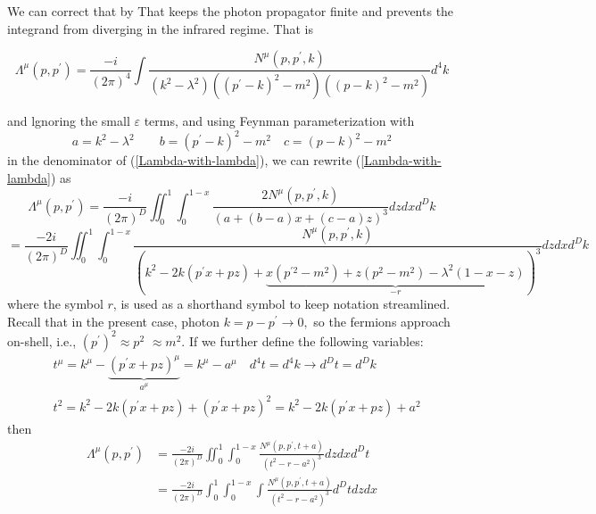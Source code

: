 We can correct that by  That keeps the photon propagator finite and prevents the integrand from diverging in the infrared regime. That is
\begin{qt}
    \begin{equation}\Lambda^{\mu}\left(p, p^{\prime}\right)=\frac{-i}{(2 \pi)^{4}} \int \frac{N^{\mu}\left(p, p^{\prime}, k\right)}{\left(k^{2}-\lambda^{2}\right)\left(\left(p^{\prime}-k\right)^{2}-m^{2}\right)\left((p-k)^{2}-m^{2}\right)} d^{4}k
    \label{Lambda-with-lambda}
    \end{equation}
\end{qt}
and  lgnoring the small $\varepsilon$ terms, and using Feynman parameterization with
$$a=k^{2}-\lambda^{2} \quad \quad b=\left(p^{\prime}-k\right)^{2}-m^{2} \quad c=(p-k)^{2}-m^{2}$$
in the denominator of (\ref{Lambda-with-lambda}), we can rewrite (\ref{Lambda-with-lambda}) as
$$\Lambda^{\mu}\left(p, p^{\prime}\right)=\frac{-i}{(2 \pi)^{D}} \iint_{0}^{1} \int_{0}^{1-x} \frac{2 N^{\mu}\left(p, p^{\prime}, k\right)}{(a+(b-a) x+(c-a) z)^{3}} d z d x d^{D} k$$
$$=\frac{-2 i}{(2 \pi)^{D}} \iint_{0}^{1} \int_{0}^{1-x} \frac{N^{\mu}\left(p, p^{\prime}, k\right)}{\left(k^{2}-2 k\left(p^{\prime} x+p z\right)+\underbrace{x\left(p^{\prime 2}-m^{2}\right)+z\left(p^{2}-m^{2}\right)-\lambda^{2}(1-x-z)}_{-r}\right)^{3}} d z d x d^{D} k$$
where the symbol $r$, is used as a shorthand symbol to keep notation streamlined. Recall that in the present case, photon $k=p-p^{\prime} \rightarrow 0,$ so the fermions approach on-shell, i.e., $\left(p^{\prime}\right)^{2} \approx p^{2}$ $\approx m^{2}$. If we further define the following variables:
$$\begin{aligned}
&t^{\mu}=k^{\mu}-\underbrace{\left(p^{\prime} x+p z\right)^{\mu}}_{a^{\mu}}=k^{\mu}-a^{\mu} \quad d^{4} t=d^{4} k \rightarrow d^{D} t=d^{D} k\\
&t^{2}=k^{2}-2 k\left(p^{\prime} x+p z\right)+\left(p^{\prime} x+p z\right)^{2}=k^{2}-2 k\left(p^{\prime} x+p z\right)+a^{2}
\end{aligned}$$
then
\begin{equation}\begin{aligned}
\Lambda^{\mu}\left(p, p^{\prime}\right) &=\frac{-2 i}{(2 \pi)^{D}} \iint_{0}^{1} \int_{0}^{1-x} \frac{N^{\mu}\left(p, p^{\prime}, t+a\right)}{\left(t^{2}-r-a^{2}\right)^{3}} d z d x d^{D} t \\
&=\frac{-2 i}{(2 \pi)^{D}} \int_{0}^{1} \int_{0}^{1-x} \int \frac{N^{\mu}\left(p, p^{\prime}, t+a\right)}{\left(t^{2}-r-a^{2}\right)^{3}} d^{D} t d z d x
\end{aligned}\end{equation}
